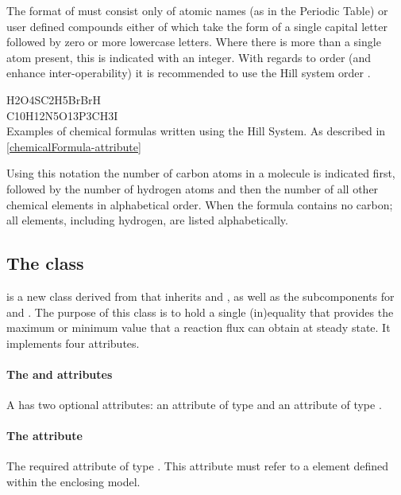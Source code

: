 The format of  must consist only of atomic names (as in the Periodic Table) or user defined compounds either of which take the form of a single capital letter followed by zero or more lowercase letters. Where there is more than a single atom present, this is indicated with an integer. With regards to order (and enhance inter-operability) it is recommended to use the Hill system order \cite{hillsystem, hillwikipedia}.

%
\begin{table}[h!]
  H2O4S\qquad C2H5Br\qquad BrH\\
  C10H12N5O13P3\qquad CH3I\\
  \caption{Examples of chemical formulas written using the Hill System. As described in \ref{chemicalFormula-attribute}}\label{table:hill}
\end{table}
%
Using this notation the number of carbon atoms in a molecule is indicated first, followed by the number of hydrogen atoms and then the number of all other chemical elements in alphabetical order. When the formula contains no carbon; all elements, including hydrogen, are listed alphabetically.



\subsection{The \FBC {} class}
\label{fluxbound-class}

\FluxBound is a new \FBC class derived from \SBML \SBase that inherits
 and , as well as the subcomponents for
\Annotation and \Notes. The purpose of this class is to hold a single
(in)equality that provides the maximum or minimum value that a reaction flux
can obtain at steady state. It implements four attributes.

\paragraph{The  and  attributes}
A \FluxBound has two optional attributes:  an attribute of type
 and  an attribute of type .

\paragraph{The  attribute}
The required  attribute of type . This attribute must refer to a \Reaction element defined within the enclosing model.

